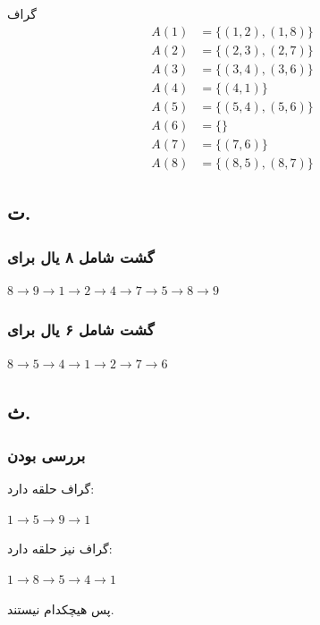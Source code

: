 \documentclass{article}
\begin{document}
\begin{multicols}{2}
گراف 
\begin{align*}
A( 1 ) &= \{( 1, 2 ), ( 1, 8 ) \}\\
A( 2 ) &= \{( 2, 3 ), ( 2, 7 ) \}\\
A( 3 ) &= \{( 3, 4 ), ( 3, 6 ) \}\\
A( 4 ) &= \{( 4, 1 ) \}\\
A( 5 ) &= \{( 5, 4 ), ( 5, 6 ) \}\\
A( 6 ) &= \{ \}\\
A( 7 ) &= \{( 7, 6 ) \}\\
A( 8 ) &= \{( 8, 5 ), ( 8, 7 ) \}
\end{align*}

\subsection*{ت.}
\subsubsection*{گشت شامل ۸ یال برای }
\begin{LTR}
$8 \rightarrow 9 \rightarrow 1 \rightarrow 2 \rightarrow 4 \rightarrow 7 \rightarrow 5 \rightarrow 8 \rightarrow 9$
\end{LTR}

\subsubsection*{گشت شامل ۶ یال برای }
\begin{LTR}
$8 \rightarrow 5 \rightarrow 4 \rightarrow 1 \rightarrow 2 \rightarrow 7 \rightarrow 6$
\end{LTR}

\pagebreak

\subsection*{ث.}
\subsubsection*{بررسی  بودن}
گراف
حلقه دارد:
\begin{LTR}
$1 \rightarrow 5 \rightarrow 9 \rightarrow 1$
\end{LTR}

گراف
نیز حلقه دارد:
\begin{LTR}
$1 \rightarrow 8 \rightarrow 5 \rightarrow 4 \rightarrow 1$
\end{LTR}
پس هیچکدام
نیستند.


\end{multicols}
\end{document}

